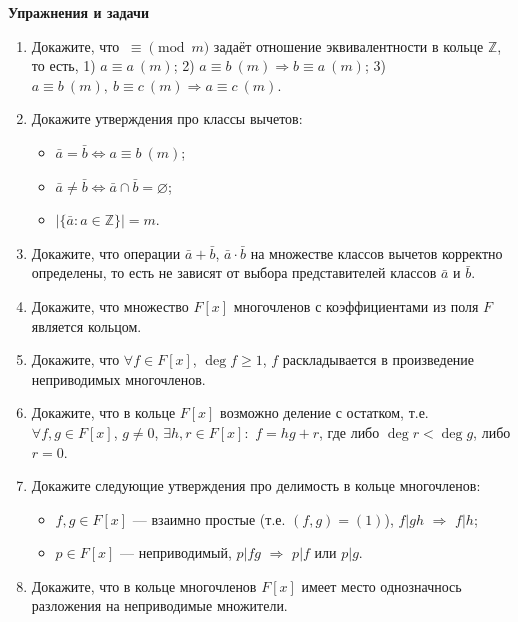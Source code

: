 \noindent\textbf{Упражнения и задачи}

\begin{enumerate}[topsep=0pt]
    \item Докажите, что $\ \equiv \pmod{m}$ задаёт отношение эквивалентности в кольце $\mathbb{Z}$, то есть, 1) $a \equiv a\ (m)$; 2) $a \equiv b\ (m) \Rightarrow b \equiv a\ (m)$; 3) $a \equiv b\ (m),\ b \equiv c\ (m) \Rightarrow a \equiv c\ (m)$.

    \item Докажите утверждения про классы вычетов: 
    \begin{itemize}
        \item $\bar{a} = \bar{b} \Leftrightarrow a \equiv b\ (m)$;
        \item $\bar{a} \neq \bar{b} \Leftrightarrow \bar{a} \cap \bar{b}=\varnothing$;
        \item $|\{\bar{a}: a\in \mathbb{Z}\}|=m$.
    \end{itemize}

    \item Докажите, что операции $\bar{a}+\bar{b}$, $\bar{a} \cdot \bar{b}$ на множестве классов вычетов корректно определены, то есть не зависят от выбора представителей классов $\bar{a}$ и $\bar{b}$.

    \item Докажите, что множество $F[x]$ многочленов с коэффициентами из поля $F$ является кольцом.

    \item Докажите, что $\forall f\in F[x]$, $\deg f \geqslant 1$, $f$ раскладывается в произведение неприводимых многочленов.

    \item Докажите, что в кольце $F[x]$ возможно деление с остатком, т.е. $\forall f,g \in F[x]$, $g \neq 0$, $\exists h,r\in F[x]:$ $f=hg+r$, где либо $\deg r < \deg g$, либо $r=0$.

    \item Докажите следующие утверждения про делимость в кольце многочленов:
    \begin{itemize}
        \item $f,g\in F[x]$ --- взаимно простые (т.е. $(f,g)=(1)$), $f|gh$ $\Rightarrow$ $f|h$;
        \item $p \in F[x]$ --- неприводимый, $p|fg$ $\Rightarrow$ $p|f$ или $p|g$.
    \end{itemize}

    \item Докажите, что в кольце многочленов $F[x]$ имеет место однозначнось разложения на неприводимые множители.
    

\end{enumerate}
